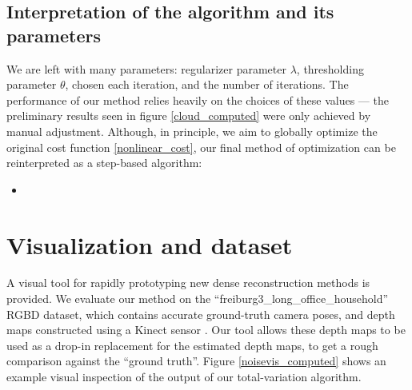 \documentclass[conference]{IEEEtran}
\begin{document}
\subsection{Interpretation of the algorithm and its parameters}
We are left with many parameters: regularizer parameter $\lambda$, thresholding parameter $\theta$, chosen each iteration, and the number of iterations.
The performance of our method relies heavily on the choices of these values --- the preliminary results seen in figure \ref{cloud_computed}
were only achieved by manual adjustment. Although, in principle, we aim to globally optimize the original cost function \eqref{nonlinear_cost},
our final method of optimization can be reinterpreted as a step-based algorithm:
\begin{itemize}
    \item
\end{itemize}



\section{Visualization and dataset}
A visual tool for rapidly prototyping new dense reconstruction methods is provided.
We evaluate our method on the ``freiburg3\_long\_office\_household'' RGBD dataset, which contains accurate ground-truth camera poses, and
depth maps constructed using a Kinect sensor \cite{dataset} \cite{largescale}. Our tool allows these depth maps to be used as a drop-in replacement for the estimated
depth maps, to get a rough comparison against the ``ground truth''. Figure \ref{noisevis_computed} shows an example visual inspection of the output
of our total-variation algorithm.
\end{document}
